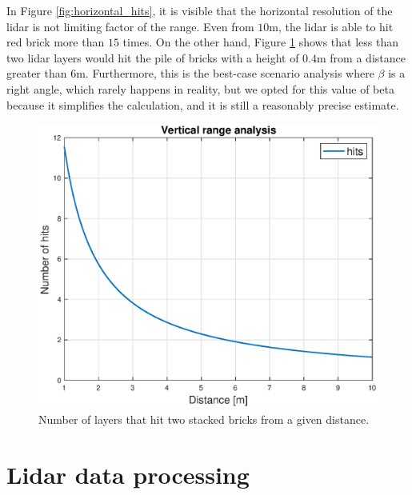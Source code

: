 In Figure \ref{fig:horizontal_hits}, it is visible that the horizontal resolution of the lidar is not limiting factor of the range. Even from $10$m, the lidar is able to hit red brick more than $15$ times. On the other hand, Figure \ref{fig:vertical_hits} shows that less than two lidar layers would hit the pile of bricks with a height of $0.4$m from a distance greater than $6$m. Furthermore, this is the best-case scenario analysis where $\beta$ is a right angle, which rarely happens in reality, but we opted for this value of beta because it simplifies the calculation, and it is still a reasonably precise estimate.

\begin{figure}[H]
	\centering
	\includegraphics[scale=0.55]{fig/vertical_range.eps}
	\caption[Vertical range chart]{Number of layers that hit two stacked bricks from a given distance.}
	\label{fig:vertical_hits}
\end{figure}

\section{Lidar data processing}

